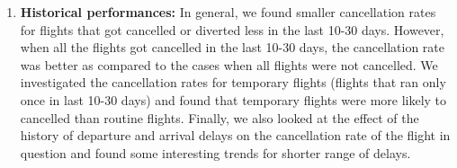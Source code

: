 \documentclass[12pt]{article}
\begin{document}
\begin{enumerate}
\item \textbf{Historical performances:}  In general, we found smaller cancellation rates for flights that got cancelled or diverted less in the last 10-30 days. However, when all the flights got cancelled in the last 10-30 days, the cancellation rate was better as compared to the cases when all flights were not cancelled. We investigated the cancellation rates for temporary flights (flights that ran only once in last 10-30 days) and found that temporary flights were more likely to cancelled than routine flights. Finally, we also looked at the effect of the history of departure and arrival delays on the cancellation rate of the flight in question and found some interesting trends for shorter range of delays. 
\end{enumerate}
\end{document}
